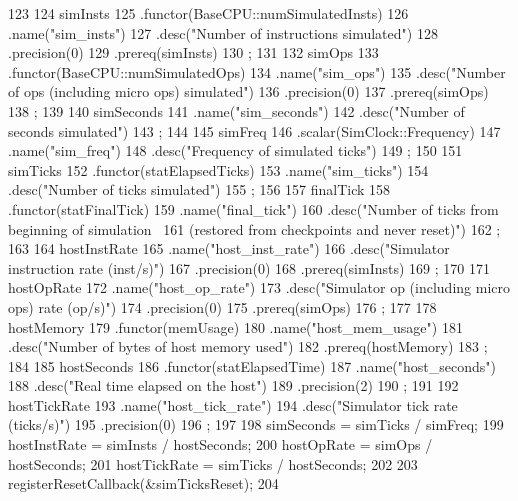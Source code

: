 \begin{DoxyCode}
123 {
124     simInsts
125         .functor(BaseCPU::numSimulatedInsts)
126         .name("sim_insts")
127         .desc("Number of instructions simulated")
128         .precision(0)
129         .prereq(simInsts)
130         ;
131 
132     simOps
133         .functor(BaseCPU::numSimulatedOps)
134         .name("sim_ops")
135         .desc("Number of ops (including micro ops) simulated")
136         .precision(0)
137         .prereq(simOps)
138         ;
139 
140     simSeconds
141         .name("sim_seconds")
142         .desc("Number of seconds simulated")
143         ;
144 
145     simFreq
146         .scalar(SimClock::Frequency)
147         .name("sim_freq")
148         .desc("Frequency of simulated ticks")
149         ;
150 
151     simTicks
152         .functor(statElapsedTicks)
153         .name("sim_ticks")
154         .desc("Number of ticks simulated")
155         ;
156 
157     finalTick
158         .functor(statFinalTick)
159         .name("final_tick")
160         .desc("Number of ticks from beginning of simulation \
161 (restored from checkpoints and never reset)")
162         ;
163 
164     hostInstRate
165         .name("host_inst_rate")
166         .desc("Simulator instruction rate (inst/s)")
167         .precision(0)
168         .prereq(simInsts)
169         ;
170 
171     hostOpRate
172         .name("host_op_rate")
173         .desc("Simulator op (including micro ops) rate (op/s)")
174         .precision(0)
175         .prereq(simOps)
176         ;
177 
178     hostMemory
179         .functor(memUsage)
180         .name("host_mem_usage")
181         .desc("Number of bytes of host memory used")
182         .prereq(hostMemory)
183         ;
184 
185     hostSeconds
186         .functor(statElapsedTime)
187         .name("host_seconds")
188         .desc("Real time elapsed on the host")
189         .precision(2)
190         ;
191 
192     hostTickRate
193         .name("host_tick_rate")
194         .desc("Simulator tick rate (ticks/s)")
195         .precision(0)
196         ;
197 
198     simSeconds = simTicks / simFreq;
199     hostInstRate = simInsts / hostSeconds;
200     hostOpRate = simOps / hostSeconds;
201     hostTickRate = simTicks / hostSeconds;
202 
203     registerResetCallback(&simTicksReset);
204 }
\end{DoxyCode}


